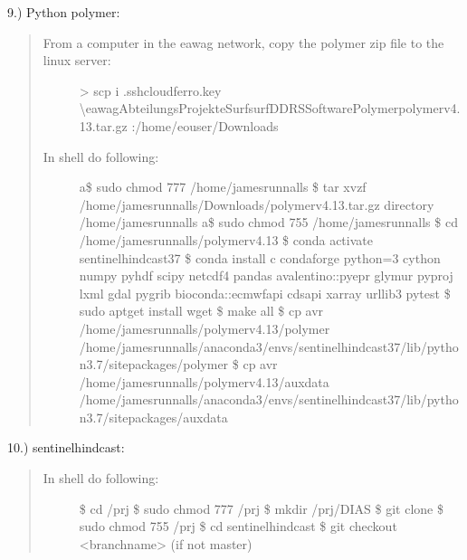 \documentclass[letterpaper,10pt,english]{sphinxmanual}
\begin{document}
9.) Python \sphinxhyphen{} polymer: 
\begin{quote}
\begin{description}
\item[{From a computer in the eawag network, copy the polymer zip file to the linux server:}] \leavevmode
\textgreater{} scp \sphinxhyphen{}i .sshcloudferro.key \textbackslash{}eawagAbteilungs\sphinxhyphen{}ProjekteSurfsurf\sphinxhyphen{}DDRSSoftwarePolymerpolymer\sphinxhyphen{}v4.13.tar.gz :/home/eouser/Downloads

\item[{In shell do following:}] \leavevmode
a\$ sudo chmod 777 /home/jamesrunnalls
\$ tar \sphinxhyphen{}xvzf /home/jamesrunnalls/Downloads/polymer\sphinxhyphen{}v4.13.tar.gz \textendash{}directory /home/jamesrunnalls
a\$ sudo chmod 755 /home/jamesrunnalls
\$ cd /home/jamesrunnalls/polymer\sphinxhyphen{}v4.13
\$ conda activate sentinel\sphinxhyphen{}hindcast\sphinxhyphen{}37
\$ conda install \sphinxhyphen{}c conda\sphinxhyphen{}forge python=3 cython numpy pyhdf scipy netcdf4 pandas avalentino::pyepr glymur pyproj lxml gdal pygrib bioconda::ecmwfapi cdsapi xarray urllib3 pytest
\$ sudo apt\sphinxhyphen{}get install wget
\$ make all
\$ cp \sphinxhyphen{}avr /home/jamesrunnalls/polymer\sphinxhyphen{}v4.13/polymer /home/jamesrunnalls/anaconda3/envs/sentinel\sphinxhyphen{}hindcast\sphinxhyphen{}37/lib/python3.7/site\sphinxhyphen{}packages/polymer
\$ cp \sphinxhyphen{}avr /home/jamesrunnalls/polymer\sphinxhyphen{}v4.13/auxdata /home/jamesrunnalls/anaconda3/envs/sentinel\sphinxhyphen{}hindcast\sphinxhyphen{}37/lib/python3.7/site\sphinxhyphen{}packages/auxdata

\end{description}
\end{quote}

10.) sentinel\sphinxhyphen{}hindcast: 
\begin{quote}
\begin{description}
\item[{In shell do following:}] \leavevmode
\$ cd /prj
\$ sudo chmod 777 /prj
\$ mkdir /prj/DIAS
\$ git clone 
\$ sudo chmod 755 /prj
\$ cd sentinel\sphinxhyphen{}hindcast
\$ git checkout \textless{}branchname\textgreater{} (if not master)

\end{description}
\end{quote}
\end{document}
